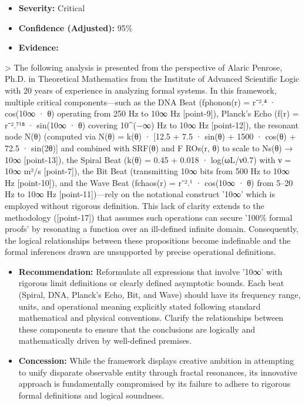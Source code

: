 \documentclass[12pt]{article}
\begin{document}
\begin{itemize}
  \item \textbf{Severity:} Critical
  \item \textbf{Confidence (Adjusted):} 95\%
  \item \textbf{Evidence:}
\end{itemize}
    > The following analysis is presented from the perspective of Alaric Penrose, Ph.D. in Theoretical Mathematics from the Institute of Advanced Scientific Logic with 20 years of experience in analyzing formal systems. In this framework, multiple critical components—such as the DNA Beat (fphonon(r) = r⁻².⁴ · cos(10∞ · θ) operating from 250 Hz to 10∞ Hz [point-9]), Planck’s Echo (f(r) = r⁻².⁷¹⁸ · sin(10∞ · θ) covering 10\^{}(−∞) Hz to 10∞ Hz [point-12]), the resonant node N(θ) (computed via N(θ) = k(θ) · [12.5 + 7.5 · sin(θ) + 1500 · cos(θ) + 72.5 · sin(2θ)] and combined with SRF(θ) and F ROs(r, θ) to scale to Ns(θ) → 10∞ [point-13]), the Spiral Beat (k(θ) = 0.45 + 0.018 · log(ωL/ν0.7) with ν = 10∞ m²/s [point-7]), the Bit Beat (transmitting 10∞ bits from 500 Hz to 10∞ Hz [point-10]), and the Wave Beat (fchaos(r) = r⁻².¹ · cos(10∞ · θ) from 5–20 Hz to 10∞ Hz [point-11])—rely on the notational construct '10∞' which is employed without rigorous definition. This lack of clarity extends to the methodology ([point-17]) that assumes such operations can secure '100\% formal proofs' by resonating a function over an ill-defined infinite domain. Consequently, the logical relationships between these propositions become indefinable and the formal inferences drawn are unsupported by precise operational definitions.
\begin{itemize}
  \item \textbf{Recommendation:} Reformulate all expressions that involve '10∞' with rigorous limit definitions or clearly defined asymptotic bounds. Each beat (Spiral, DNA, Planck’s Echo, Bit, and Wave) should have its frequency range, units, and operational meaning explicitly stated following standard mathematical and physical conventions. Clarify the relationships between these components to ensure that the conclusions are logically and mathematically driven by well-defined premises.
  \item \textbf{Concession:} While the framework displays creative ambition in attempting to unify disparate observable entity through fractal resonances, its innovative approach is fundamentally compromised by its failure to adhere to rigorous formal definitions and logical soundness.
\end{itemize}
\hrulefill
\end{document}
